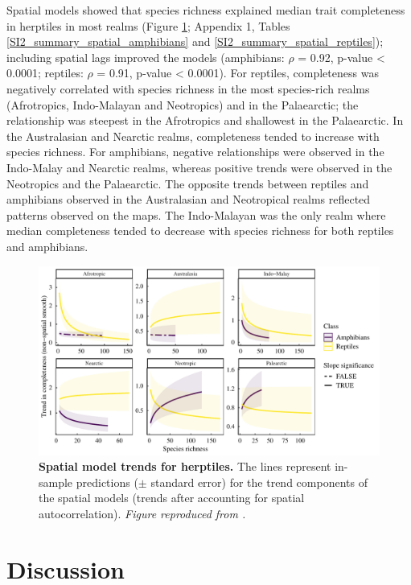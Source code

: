 Spatial models showed that species richness explained median trait completeness in herptiles in most realms (Figure \ref{2_Trends}; Appendix 1, Tables \ref{SI2_summary_spatial_amphibians} and \ref{SI2_summary_spatial_reptiles}); including spatial lags improved the models (amphibians: $\rho$ = 0.92, p-value < 0.0001; reptiles: $\rho$ = 0.91, p-value < 0.0001). For reptiles, completeness was negatively correlated with species richness in the most species-rich realms (Afrotropics, Indo-Malayan and Neotropics) and in the Palaearctic; the relationship was steepest in the Afrotropics and shallowest in the Palaearctic. In the Australasian and Nearctic realms, completeness tended to increase with species richness. For amphibians, negative relationships were observed in the Indo-Malay and Nearctic realms, whereas positive trends were observed in the Neotropics and the Palaearctic. The opposite trends between reptiles and amphibians observed in the Australasian and Neotropical realms reflected patterns observed on the maps. The Indo-Malayan was the only realm where median completeness tended to decrease with species richness for both reptiles and amphibians.

\clearpage
\begin{figure}[h!]
\centering
\includegraphics[scale=0.75]{figures/Chapter2/Figure_6}
\caption[Spatial model trends for herptiles]{\textbf{Spatial model trends for herptiles.} The lines represent in-sample predictions ($\pm$ standard error) for the trend components of the spatial models (trends after accounting for spatial autocorrelation). \textit{Figure reproduced from \citet{Etard2020}.}}
\label{2_Trends}
\end{figure}


\section{Discussion}

